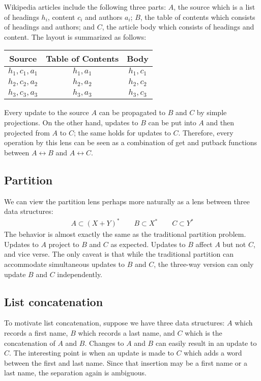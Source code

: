 \documentclass{article}
\begin{document}
Wikipedia articles include the following three parts: $A$, the source which is
a list of headings $h_i$, content $c_i$ and authors $a_i$; $B$, the table of
contents which consists of headings and authors; and $C$, the article body
which consists of headings and content. The layout is summarized as follows:
\begin{center} \begin{tabular}{c c c}
    Source & Table of Contents & Body \\
    \hline
    $h_1,c_1,a_1$ & $h_1,a_1$ & $h_1,c_1$ \\
    $h_2,c_2,a_2$ & $h_2,a_2$ & $h_2,c_2$ \\
    $h_3,c_3,a_3$ & $h_3,a_3$ & $h_3,c_3$ 
\end{tabular} \end{center}
Every update to the source $A$ can be propagated to $B$ and $C$ by
simple projections. On the other hand, updates to $B$ can be
put into $A$ and then projected from $A$ to $C$; the same holds
for updates to $C$. Therefore, every operation by this lens
can be seen as a combination of get and putback functions 
between $A \leftrightarrow B$ and $A \leftrightarrow C$. 

\subsection*{Partition}

We can view the partition lens perhaps more naturally as a lens
between three data structures: 
\begin{align*}
  A \subset (X + Y)^\ast \qquad B \subset X^\ast \qquad C \subset Y^\ast
\end{align*}
The behavior is almost exactly the same as the traditional partition
problem. Updates to $A$ project to $B$ and $C$ as expected. Updates to
$B$ affect $A$ but not $C$, and vice verse. The only caveat is
that while the traditional partition can accommodate simultaneous
updates to $B$ and $C$, the three-way version can only update
$B$ and $C$ independently. 

\subsection*{List concatenation} 

To motivate list concatenation, suppose we have three data structures:
$A$ which records a first name, $B$ which records a last name, and
$C$ which is the concatenation of $A$ and $B$. Changes to $A$ and $B$
can easily result in an update to $C$. The interesting point is when
an update is made to $C$ which adds a word between the first and
last name. Since that insertion may be a first name or a last name,
the separation again is ambiguous. 
\end{document}
